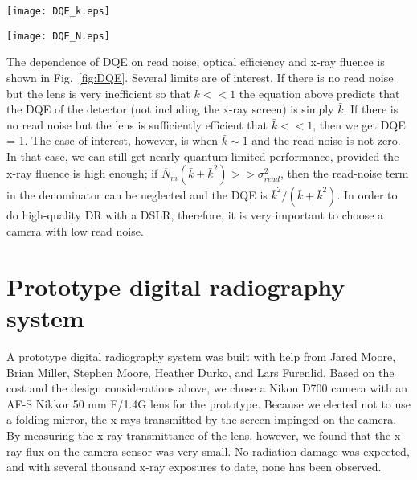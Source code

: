 \begin{figure*}[h]
	\begin{minipage}[b]{0.45\linewidth}
		\centering
		\texttt{[image: DQE\_k.eps]}
		\subcaption{}
	\end{minipage}
	\hspace{0.2cm}
	\begin{minipage}[b]{0.45\linewidth}
		\centering
		\texttt{[image: DQE\_N.eps]}
		\subcaption{}
	\end{minipage}						
\caption{DQE for detection of a uniform disk lesion on a flat background. (a): DQE vs. x-ray fluence (absorbed photons per 100 $\mathrm{\mu m}$ pixel) for fixed optical efficiency (2 photoelectrons per x-ray photon) and difference camera read-noise variances. (b): DQE vs. optical efficiency for different x-ray fluences and noise levels. Typical $\overline{N}_m$ in DR is 500 photons per pixel, and typical $\sigma_{read}^2$ in a modern DSLR is about 25 photons per pixel(5 electrons RMS).}
\label{fig:DQE}
\end{figure*}

The dependence of DQE on read noise, optical efficiency and x-ray fluence is shown in Fig.~\ref{fig:DQE}. Several limits are of interest. If there is no read noise but the lens is very inefficient so that $\bar{k} << 1$ the equation above predicts that the DQE of the detector (not including the x-ray screen) is simply $\bar{k}$.  If there is no read noise but the lens is sufficiently efficient that $\bar{k} << 1$, then we get DQE = 1. The case of interest, however, is when $\bar{k} \sim 1$ and the read noise is not zero. In that case, we can still get nearly quantum-limited performance, provided the x-ray fluence is high enough; if $\overline{N}_m(\bar{k}+\bar{k}^2) >> \sigma_{read}^2$, then the read-noise term in the denominator can be neglected and the DQE is $\bar{k}^2/(\bar{k}+\bar{k}^2)$. In order to do high-quality DR with a DSLR, therefore, it is very important to choose a camera with low read noise.

\section{Prototype digital radiography system}
A prototype digital radiography system was built with help from Jared Moore, Brian Miller, Stephen Moore, Heather Durko, and Lars Furenlid.  Based on the cost and the design considerations above, we chose a Nikon D700 camera with an AF-S Nikkor 50 mm F/1.4G lens for the prototype.  Because we elected not to use a folding mirror, the x-rays transmitted by the screen impinged on the camera. By measuring the x-ray transmittance of the lens, however, we found that the x-ray flux on the camera sensor was very small. No radiation damage was expected, and with several thousand x-ray exposures to date, none has been observed.

